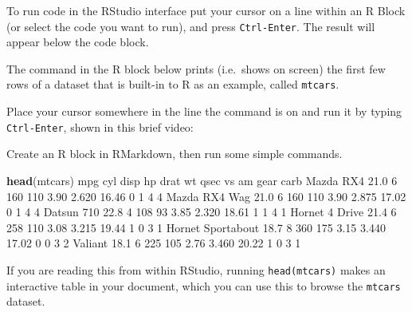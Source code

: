 \documentclass[]{article}
\newenvironment{Shaded}{\begin{snugshade}}{\end{snugshade}}
\newcommand{\DecValTok}[1]{\textcolor[rgb]{0.00,0.00,0.81}{#1}}
\newcommand{\FloatTok}[1]{\textcolor[rgb]{0.00,0.00,0.81}{#1}}
\newcommand{\KeywordTok}[1]{\textcolor[rgb]{0.13,0.29,0.53}{\textbf{#1}}}
\newcommand{\NormalTok}[1]{#1}
\begin{document}
To run code in the RStudio interface put your cursor on a line within an R Block
(or select the code you want to run), and press \texttt{Ctrl-Enter}. The result will
appear below the code block.

The command in the R block below prints (i.e.~shows on screen) the first few
rows of a dataset that is built-in to R as an example, called \texttt{mtcars}.

Place your cursor somewhere in the line the command is on and run it by typing
\texttt{Ctrl-Enter}, shown in this brief video:

Create an R block in RMarkdown, then run some simple commands.

\begin{Shaded}
\begin{Highlighting}[]
\KeywordTok{head}\NormalTok{(mtcars)}
\NormalTok{                   mpg cyl disp  hp drat    wt  qsec vs am gear carb}
\NormalTok{Mazda RX4         }\FloatTok{21.0}   \DecValTok{6}  \DecValTok{160} \DecValTok{110} \FloatTok{3.90} \FloatTok{2.620} \FloatTok{16.46}  \DecValTok{0}  \DecValTok{1}    \DecValTok{4}    \DecValTok{4}
\NormalTok{Mazda RX4 Wag     }\FloatTok{21.0}   \DecValTok{6}  \DecValTok{160} \DecValTok{110} \FloatTok{3.90} \FloatTok{2.875} \FloatTok{17.02}  \DecValTok{0}  \DecValTok{1}    \DecValTok{4}    \DecValTok{4}
\NormalTok{Datsun }\DecValTok{710}        \FloatTok{22.8}   \DecValTok{4}  \DecValTok{108}  \DecValTok{93} \FloatTok{3.85} \FloatTok{2.320} \FloatTok{18.61}  \DecValTok{1}  \DecValTok{1}    \DecValTok{4}    \DecValTok{1}
\NormalTok{Hornet }\DecValTok{4}\NormalTok{ Drive    }\FloatTok{21.4}   \DecValTok{6}  \DecValTok{258} \DecValTok{110} \FloatTok{3.08} \FloatTok{3.215} \FloatTok{19.44}  \DecValTok{1}  \DecValTok{0}    \DecValTok{3}    \DecValTok{1}
\NormalTok{Hornet Sportabout }\FloatTok{18.7}   \DecValTok{8}  \DecValTok{360} \DecValTok{175} \FloatTok{3.15} \FloatTok{3.440} \FloatTok{17.02}  \DecValTok{0}  \DecValTok{0}    \DecValTok{3}    \DecValTok{2}
\NormalTok{Valiant           }\FloatTok{18.1}   \DecValTok{6}  \DecValTok{225} \DecValTok{105} \FloatTok{2.76} \FloatTok{3.460} \FloatTok{20.22}  \DecValTok{1}  \DecValTok{0}    \DecValTok{3}    \DecValTok{1}
\end{Highlighting}
\end{Shaded}

If you are reading this from within RStudio, running \texttt{head(mtcars)} makes an
interactive table in your document, which you can use this to browse the
\texttt{mtcars} dataset.
\end{document}
